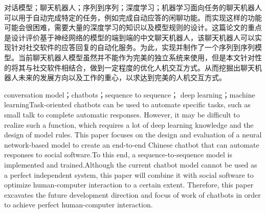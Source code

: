 \begin{chineseabstract}
    {对话模型；聊天机器人；序列到序列；深度学习；机器学习}面向任务的聊天机器人可以用于自动完成特定的任务，例如完成自动应答的闲聊功能。而实现这样的功能可能会很困难，需要大量的深度学习的知识以及模型规则的设计。这篇论文的重点是设计评价基于神经网络的模型的端到端的中文聊天机器人，该聊天机器人可以实现针对社交软件的应答回复的自动化服务。为此，实现并制作了一个序列到序列模型。当前聊天机器人模型虽然并不能作为完美的独立系统来使用，但是本文针对性的将其与社交软件相结合，做到一定程度的优化人机交互方式。从而挖掘出聊天机器人未来的发展方向以及工作的重心，以求达到完美的人机交互方式。
\end{chineseabstract}
\begin{englishabstract}
    {conversation model；chatbots；sequence to sequence；
    deep learning；machine learning}Task-oriented chatbots can be used to automate specific tasks, such as small talk to complete automatic responses. However, it may be difficult to realize such a function, which requires a lot of deep learning knowledge and the design of model rules. This paper focuses on the design and evaluation of a neural network-based model to create an end-to-end Chinese chatbot that can automate responses to social software.To this end, a sequence-to-sequence model is implemented and trained.Although the current chatbot model cannot be used as a perfect independent system, this paper will combine it with social software to optimize human-computer interaction to a certain extent. Therefore, this paper excavates the future development direction and focus of work of chatbots in order to achieve perfect human-computer interaction.
\end{englishabstract}
